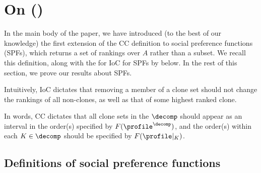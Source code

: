 \section{On  ()}
In the main body of the paper, we have introduced (to the best of our knowledge) the first extension of the CC definition to social preference functions (SPFs), which returns a set of rankings over $A$ rather than a subset. We recall this definition, along with the for IoC for SPFs by \citet{Freeman14:Axiomatic} below. In the rest of this section, we prove our results about SPFs.

\iocspf*

Intuitively, IoC dictates that removing a member of a clone set should not change the rankings of all non-clones, as well as that of some highest ranked clone.

\ccspf*

In words, CC dictates that all clone sets in the $\decomp$ should appear as an interval in the order(s) specified by $F(\profile^\decomp)$, and the order(s) within each $K \in \decomp$ should be specified by $F(\profile|_K)$.


\subsection{Definitions of social preference functions}\label{appsec:spfdefs}

